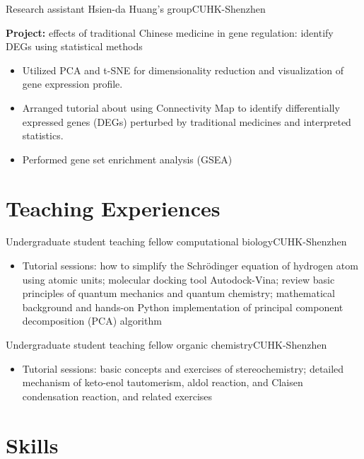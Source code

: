 \documentclass[12pt,a4paper,sans]{moderncv}
\newcommand\linksymbol{\scriptsize\faExternalLink*}
\newcommand{\cvsection}[1]{\section{{#1}}}
\begin{document}
{Research assistant}{}
{Hsien-da Huang's group}{CUHK-Shenzhen}
{\small
    \textbf{Project:} effects of traditional Chinese medicine in gene regulation:
    identify DEGs using statistical methods
    \begin{itemize}[itemsep=2pt]
        \item Utilized PCA and t-SNE for dimensionality reduction and visualization of gene expression profile.
        \item Arranged tutorial about using Connectivity Map to identify differentially expressed genes (DEGs) perturbed by
        traditional medicines and interpreted statistics.
        \item Performed gene set enrichment analysis (GSEA)
    \end{itemize}
}

\cvsection{Teaching Experiences}
{Undergraduate student teaching fellow}{}
{computational biology}{CUHK-Shenzhen}
{
    \begin{itemize}[itemsep=2pt]
        \item Tutorial sessions: how to simplify the 
        Schrödinger equation of hydrogen atom using
        atomic units; molecular docking tool Autodock-Vina;
        review basic principles of quantum mechanics and quantum chemistry;
        mathematical background and hands-on Python implementation of principal component decomposition (PCA) algorithm
        \href{https://github.com/haoran0115/pca-implementation}{\linksymbol}
    \end{itemize}
}
{Undergraduate student teaching fellow}{}
{organic chemistry}{CUHK-Shenzhen}
{
    \begin{itemize}[itemsep=2pt]
        \item Tutorial sessions: basic concepts and exercises of stereochemistry;
        detailed mechanism of keto-enol tautomerism, aldol reaction,
        and Claisen condensation reaction, and related exercises
    \end{itemize}
}

\cvsection{Skills}
\end{document}
